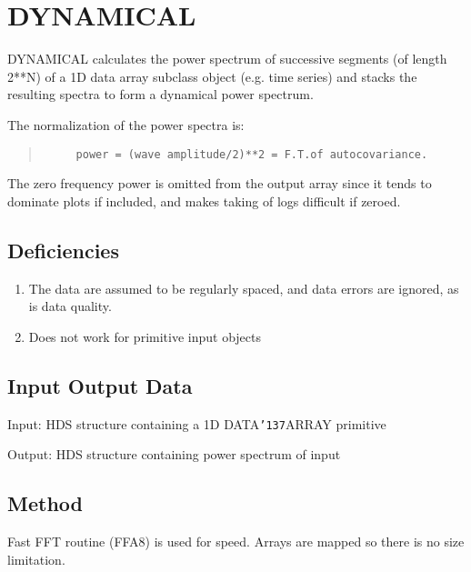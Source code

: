 \documentclass{book}
\renewcommand{\_}{{\tt\char'137}}     %
\begin{document}
\section{DYNAMICAL}
DYNAMICAL calculates the power spectrum of successive segments
(of length 2**N) of a 1D data array subclass object (e.g. time
series) and stacks the resulting spectra to form a dynamical
power spectrum.
 
The normalization of the power spectra is:
 
\begin{quote}\begin{verbatim}
     power = (wave amplitude/2)**2 = F.T.of autocovariance.
\end{verbatim}\end{quote}
The zero frequency power is omitted from the output array since
it tends to dominate plots if included, and makes taking of logs
difficult if zeroed.
 
\subsection{Deficiencies}
 
\begin{enumerate}
\item The data are assumed to be regularly spaced, and
data errors are ignored, as is data quality.
\item Does not work for primitive input objects
\end{enumerate}
\subsection{Input Output Data}
Input: HDS structure containing a 1D DATA\_ARRAY primitive
 
Output: HDS structure containing power spectrum of input
 
\subsection{Method}
Fast FFT routine (FFA8) is used for speed. Arrays are mapped so
there is no size limitation.
\end{document}
